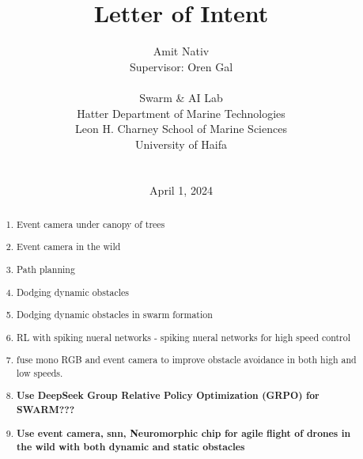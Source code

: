 \documentclass{article}
\title{Letter of Intent}
\author{
    Amit Nativ \\ 
    Supervisor: Oren Gal \\
    \\
    Swarm \& AI Lab \\
    Hatter Department of Marine Technologies \\
    Leon H. Charney School of Marine Sciences \\
    University of Haifa \\
    \\
    \\
    April 1, 2024
}
\begin{document}
\maketitle

\begin{abstract}
\begin{enumerate}
    \item Event camera under canopy of trees
    \item Event camera in the wild
    \item Path planning
    \item Dodging dynamic obstacles
    \item Dodging dynamic obstacles in swarm formation
    \item RL with spiking nueral networks - spiking nueral networks for high speed control
    \item fuse mono RGB and event camera to improve obstacle avoidance in both high and low speeds. 
    \item \textbf{Use DeepSeek Group Relative Policy Optimization (GRPO) for SWARM???} 
    \item \textbf{Use event camera, snn, Neuromorphic chip for agile flight of drones in the wild with both dynamic and static obstacles}
    
\end{enumerate}
\end{abstract}
\end{document}
